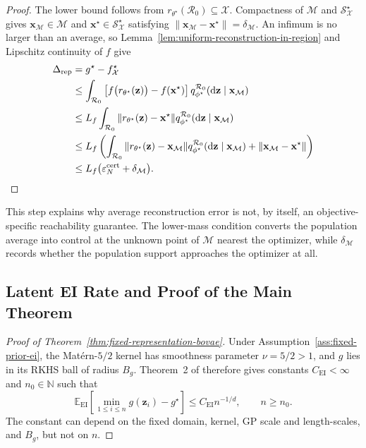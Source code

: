 \documentclass[pdflatex,sn-mathphys-num]{sn-jnl}%
\theoremstyle{thmstyleone}%
\theoremstyle{thmstyletwo}%
\theoremstyle{thmstylethree}%
\begin{document}
\begin{appendices}
\begin{proof}
The lower bound follows from
$r_{\theta^\star}(\mathcal{R}_0)\subseteq\mathcal{X}$.  Compactness of $\mathcal{M}$ and $\mathcal{S}_{\mathcal{X}}^\star$ gives $\mathbf{x}_{\mathcal{M}}\in\mathcal{M}$ and $\mathbf{x}^\star\in\mathcal{S}_{\mathcal{X}}^\star$ satisfying $\|\mathbf{x}_{\mathcal{M}}-\mathbf{x}^\star\|=\delta_{\mathcal{M}}$.  An infimum is no larger than an average, so Lemma~\ref{lem:uniform-reconstruction-in-region} and Lipschitz continuity of $f$ give
\begin{align}
  \Delta_{\mathrm{rep}}
  &=g^\star-f_{\mathcal{X}}^\star
  \notag\\
  &\leq
  \int_{\mathcal{R}_0}
    \left[f\bigl(r_{\theta^\star}(\mathbf{z})\bigr)
      -f(\mathbf{x}^\star)\right]
    q_{\phi^\star}^{\mathcal{R}_0}
      (\mathrm d\mathbf{z}\mid\mathbf{x}_{\mathcal{M}})
  \notag\\
  &\leq L_f
  \int_{\mathcal{R}_0}
    \|r_{\theta^\star}(\mathbf{z})-\mathbf{x}^\star\|
    q_{\phi^\star}^{\mathcal{R}_0}
      (\mathrm d\mathbf{z}\mid\mathbf{x}_{\mathcal{M}})
  \notag\\
  &\leq L_f\left(
    \int_{\mathcal{R}_0}
      \|r_{\theta^\star}(\mathbf{z})-\mathbf{x}_{\mathcal{M}}\|
      q_{\phi^\star}^{\mathcal{R}_0}
        (\mathrm d\mathbf{z}\mid\mathbf{x}_{\mathcal{M}})
    +\|\mathbf{x}_{\mathcal{M}}-\mathbf{x}^\star\|
  \right)
  \notag\\
  &\leq L_f\bigl(\varepsilon_N^{\mathrm{cert}}
                  +\delta_{\mathcal{M}}\bigr).
  \label{eq:representation-gap-proof}
\end{align}
\end{proof}

This step explains why average reconstruction error is not, by itself, an objective-specific reachability guarantee.  The lower-mass condition converts the population average into control at the unknown point of $\mathcal{M}$ nearest the optimizer, while $\delta_{\mathcal{M}}$ records whether the population support approaches the optimizer at all.

\subsection{Latent EI Rate and Proof of the Main Theorem}

\begin{proof}[Proof of Theorem~\ref{thm:fixed-representation-bovae}]
Under Assumption~\ref{ass:fixed-prior-ei}, the Mat\'ern-$5/2$ kernel has smoothness parameter $\nu=5/2>1$, and $g$ lies in its RKHS ball of radius
$B_g$.  Theorem~2 of \cite{bull2011ego} therefore gives constants $C_{\mathrm{EI}}<\infty$ and $n_0\in\mathbb{N}$ such that
\begin{equation}
  \mathbb{E}_{\mathrm{EI}}\!\left[
    \min_{1\leq i\leq n}g(\mathbf{z}_i)-g^\star
  \right]
  \leq C_{\mathrm{EI}}n^{-1/d},
  \qquad n\geq n_0.
  \label{eq:bull-ei-specialization}
\end{equation}
The constant can depend on the fixed domain, kernel, GP scale and length-scales, and $B_g$, but not on $n$.


\end{proof}
\end{appendices}
\end{document}
